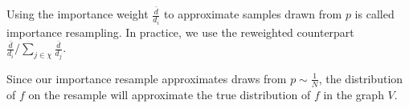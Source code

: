 \documentclass[a4paper]{article}
\begin{document}
\noindent
Using the importance weight $\frac{\bar{d}}{d_i}$ to approximate samples drawn from $p$ is called importance resampling. In practice, we use the reweighted counterpart $\frac{\bar{d}}{d_i} / \sum_{j \in \chi} \frac{\bar{d}}{d_j}$.

Since our importance resample approximates draws from $p \sim \frac{1}{N}$, the distribution of $f$ on the resample will approximate the true distribution of $f$ in the graph $V$.

\begin{comment}

To see this, note that the true density of $f$ is given by $P(f(V) = k) = V_k / N$, where $f(V)$ denotes the distribution of $f$ in the graph, $V_k = |\{i \in V: f(X_i) = k\}|$ is the number of nodes which have value $f(X_i) = k$, and $N$ is the number of nodes in the graph.

Note that the random walk gives us an observation $f(X_i)$ with probability $\pi(X_i) = d_i / D$, where $D$ is the degree of the graph. If we multiply this probability by the ``inclusion weight'' in Equation 11, we obtain



\noindent
or the uniform distribution on nodes. Using this weight, we can see that in a sample of size $n$

\begin{equation}
\hat{P}(f(X_i) = k) = \frac{V_k(n)}{n} = \frac{}
\end{equation}

This implies that when we obtain a sample from the walk $\chi$, we can approximate the true distribution of $f$ by weighting the sampled elements by $\frac{\bar{d}}{d_i}$.

Practically speaking, we can bootstrap an estimate of the distribution $f(X_i)$. For each $i \in \chi$, we use $\frac{\bar{d}}{d_i}$ as the importance weight. We can see that this process converges in distribution to $f(V)$, or the distribution in the graph.

Assume $f(V)$ is a discrete distribution (e.g. degree). Then we need to show that $P(f(X_i) = k) \to P(f(V) = k)$ as $i \to \infty$, where $f$ indicates the true distribution and $k$ is some value that $f$ takes on. Denote the set of nodes with $f(X_i = k)$ as $V_k$. The probability that $f(X_i)$ takes on value $k$ in the walk is denoted $\pi(f(X_i) = k) = \sum_{V_k} d_i / D$, or the sum degree of the set of nodes with value $f(X_i) = k$, divided by the total degree of the graph. Assume our samples are from a chain in equilibrium, then the corrected distribution has


\end{comment}
\end{document}
